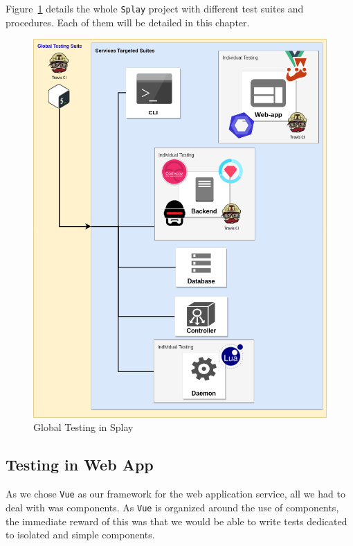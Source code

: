 \documentclass{eplmastersthesis}
\begin{document}
      Figure~\ref{global_testing} details the whole \texttt{Splay} project with different
      test suites and procedures. Each of them will be detailed in this chapter.

      \begin{figure}[H]
        \centering
        \includegraphics[scale=0.55]{figures/global_testing.png}
        \caption{\label{global_testing} Global Testing in Splay}
      \end{figure}

      \subsection{Testing in Web App}

        As we chose \texttt{Vue} as our framework for the web application service,
        all we had to deal with was components. As \texttt{Vue} is organized around
        the use of components, the immediate reward of this was that we would
        be able to write tests dedicated to isolated and simple components.
\end{document}
